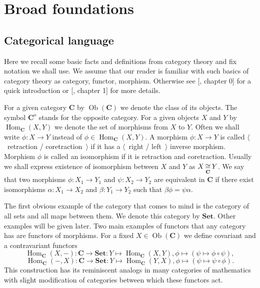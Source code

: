 
\section{Broad foundations}

\label{SectionBroadFoundations} 


\subsection{Categorical language}
\label{SubSectionCategoricalLanguage}

Here we recall some basic facts and definitions from category theory and fix notation we shall use. We assume that our reader is familiar with such basics of category theory as category, functor, morphism. Otherwise see [\cite{HelLectAndExOnFuncAn}, chapter 0] for a quick introduction or [\cite{KashivShapCatsAndSheavs}, chapter 1] for more details.

For a given category $\mathbf{C}$ by $\operatorname{Ob}(\mathbf{C})$ we denote the class of its objects. The symbol $\mathbf{C}^o$ stands for the opposite category. For a given objects $X$ and $Y$ by $\operatorname{Hom}_{\mathbf{C}}(X, Y)$ we denote the set of morphisms from $X$ to $Y$. Often we shall write $\phi:X\to Y$ instead of $\phi\in\operatorname{Hom}_{\mathbf{C}}(X,Y)$. A morphism $\phi:X\to Y$ is called $\langle$~retraction / coretraction~$\rangle$ if it has a $\langle$~right / left~$\rangle$ inverse morphism. Morphism $\phi$ is called an isomorphism if it is retraction and coretraction. Usually we shall express existence of isomorphism between $X$ and $Y$ as $X\mathop{\mathbin{\cong}}\limits_{\mathbf{C}} Y$. We say that two morphisms $\phi:X_1\to Y_1$ and $\psi:X_2\to Y_2$ are equivalent in $\mathbf{C}$ if there exist isomorphisms $\alpha:X_1\to X_2$ and $\beta:Y_1\to Y_2$ such that $\beta\phi=\psi\alpha$.

The first obvious example of the category that comes to mind is the category of all sets and all maps between them. We denote this category by $\mathbf{Set}$. Other examples will be given later. Two main examples of functors that any category has are functors of morphisms. For a fixed $X\in\operatorname{Ob}(\mathbf{C})$ we define covariant and a contravariant functors
$$
\operatorname{Hom}_{\mathbf{C}}(X,-):\mathbf{C}\to\mathbf{Set}:Y\mapsto \operatorname{Hom}_{\mathbf{C}}(X,Y), \phi\mapsto(\psi\mapsto \phi\circ\psi),
$$
$$
\operatorname{Hom}_{\mathbf{C}}(-,X):\mathbf{C}\to\mathbf{Set}:Y\mapsto \operatorname{Hom}_{\mathbf{C}}(Y,X), \phi\mapsto(\psi\mapsto \psi\circ\phi).
$$
This construction has its reminiscent analogs in many categories of mathematics with slight modification of categories between which these functors act.

